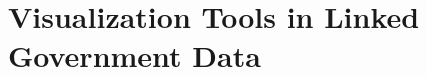 \documentclass[a4paper,11pt]{report}
\begin{document}

 
 


\chapter{Visualization Tools in Linked Government Data}
\end{document}
